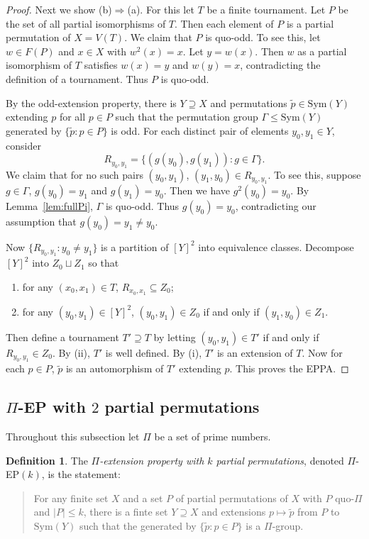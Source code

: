 \documentclass[10pt,a4paper]{amsart}
\theoremstyle{definition}
\newtheorem{definition}[theorem]{Definition}
\theoremstyle{definition}
\numberwithin{equation}{section}
\begin{document}
\begin{proof}
Next we show (b)$\Rightarrow$(a). For this let $T$ be a finite tournament. Let $P$ be the set of all partial isomorphisms of $T$. Then each element of $P$ is a partial permutation of $X=V(T)$. We claim that $P$ is quo-odd. To see this, let $w\in F(P)$ and $x\in X$ with $w^2(x)=x$. Let $y=w(x)$. Then $w$ as a partial isomorphism of $T$ satisfies $w(x)=y$ and $w(y)=x$, contradicting the definition of a tournament. Thus $P$ is quo-odd. 

By the odd-extension property, there is $Y\supseteq X$ and permutations $\tilde{p}\in \mbox{Sym}(Y)$ extending $p$ for all $p\in P$ such that the permutation group $\Gamma\leq \mbox{Sym}(Y)$ generated by $\{\tilde{p}\colon p\in P\}$ is odd. For each distinct pair of elements $y_0, y_1\in Y$, consider
$$ R_{y_0,y_1}=\{(g(y_0), g(y_1))\colon g\in \Gamma\}. $$
We claim that for no such pairs $(y_0, y_1)$, $(y_1, y_0)\in R_{y_0,y_1}$. To see this, suppose $g\in \Gamma$, $g(y_0)=y_1$ and $g(y_1)=y_0$. Then we have $g^2(y_0)=y_0$. By Lemma~\ref{lem:fullPi}, $\Gamma$ is quo-odd. Thus $g(y_0)=y_0$, contradicting our assumption that $g(y_0)=y_1\neq y_0$.

Now $\{R_{y_0, y_1}\colon y_0\neq y_1\}$ is a partition of $[Y]^2$ into equivalence classes. Decompose $[Y]^2$ into $Z_0\sqcup Z_1$ so that 
\begin{enumerate}
\item[(i)] for any $(x_0,x_1)\in T$, $R_{x_0,x_1}\subseteq Z_0$;
\item[(ii)] for any $(y_0, y_1)\in[Y]^2$, $(y_0, y_1)\in Z_0$ if and only if $(y_1,y_0)\in Z_1$.
\end{enumerate}
Then define a tournament $T'\supseteq T$ by letting $(y_0, y_1)\in T'$ if and only if $R_{y_0,y_1}\in Z_0$. By (ii), $T'$ is well defined. By (i), $T'$ is an extension of $T$. Now for each $p\in P$, $\tilde{p}$ is an automorphism of $T'$ extending $p$. This proves the EPPA.
\end{proof}



\subsection{$\Pi$-EP with $2$ partial permutations}

Throughout this subsection let $\Pi$ be a set of prime numbers.

\begin{definition} The {\em $\Pi$-extension property with $k$ partial permutations}, denoted $\Pi$-EP$(k)$, is the statement:
\begin{quote}
For any finite set $X$ and a set $P$ of partial permutations of $X$ with $P$ quo-$\Pi$ and $|P|\leq k$, there is a finte set $Y\supseteq X$ and extensions $p\mapsto \tilde{p}$ from $P$ to $\mbox{Sym}(Y)$ such that the generated by $\{\tilde{p}\colon p\in P\}$ is a $\Pi$-group.
\end{quote}
\end{definition}
\end{document}
